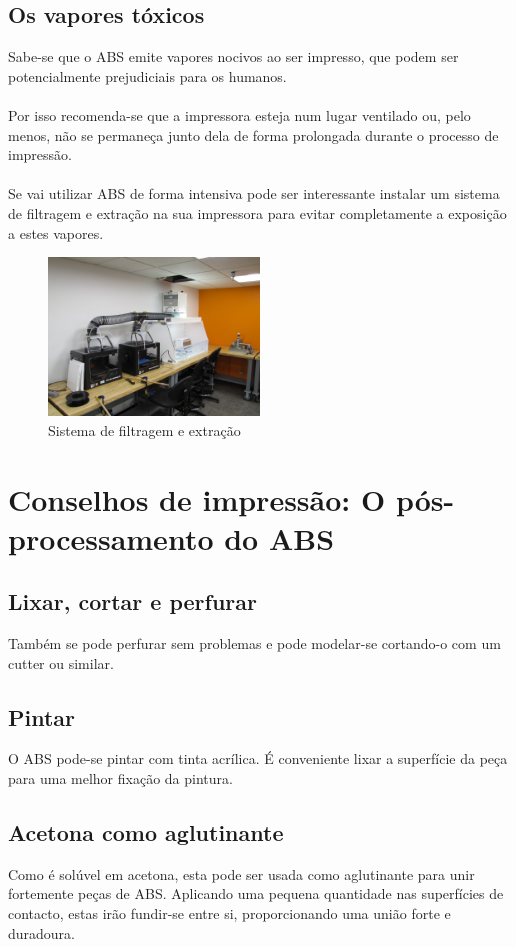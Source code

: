 \documentclass[11pt,a4paper]{article}
\begin{document}
	\subsection{Os vapores tóxicos}Sabe-se que o ABS emite vapores nocivos ao ser impresso, que podem ser potencialmente prejudiciais para os humanos.
\\\\
Por isso recomenda-se que a impressora esteja num lugar ventilado ou, pelo menos, não se permaneça junto dela de forma prolongada durante o processo de impressão.
\\\\
Se vai utilizar ABS de forma intensiva pode ser interessante instalar um sistema de filtragem e extração na sua impressora para evitar completamente a exposição a estes vapores.
\begin{figure}[H]
\centering
\includegraphics[width=0.5\textwidth,cfbox=azul_marcos 4pt 0pt]{FOTOS/VENTILACIONVAPORES}
\caption*{Sistema de filtragem e extração}
\end{figure}
\section{Conselhos de impressão: O pós-processamento do ABS}
	\subsection{Lixar, cortar e perfurar}Também se pode perfurar sem problemas e pode modelar-se cortando-o com um cutter ou similar.
	\subsection{Pintar}O ABS pode-se pintar com tinta acrílica. É conveniente lixar a superfície da peça para uma melhor fixação da pintura.
	\subsection{Acetona como aglutinante}Como é solúvel em acetona, esta pode ser usada como aglutinante para unir fortemente peças de ABS. Aplicando uma pequena quantidade nas superfícies de contacto, estas irão fundir-se entre si, proporcionando uma união forte e duradoura.
\end{document}

